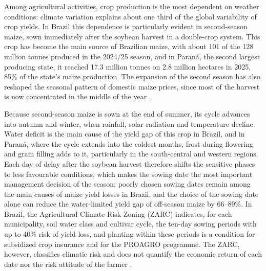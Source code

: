 \documentclass[10pt,a4paper]{article}
\begin{document}
Among agricultural activities, crop production is the most dependent on weather conditions: climate
variation explains about one third of the global variability of crop yields. In Brazil this dependence
is particularly evident in second-season maize, sown immediately after the soybean harvest in a
double-crop system. This crop has become the main source of Brazilian maize,
with about 101 of the 128 million tonnes produced in the 2024/25 season, and in Paraná, the second
largest producing state, it reached 17.3 million tonnes on 2.8 million hectares in 2025, 85\% of the
state's maize production. The expansion of the second season has also reshaped the seasonal pattern
of domestic maize prices, since most of the harvest is now concentrated in the middle of the year
\citep{ray2015, conab2025, ibge2025, souza2021}.

Because second-season maize is sown at the end of summer, its cycle advances into autumn and winter,
when rainfall, solar radiation and temperature decline. Water deficit is the main cause of the yield
gap of this crop in Brazil, and in Paraná, where the cycle extends into the coldest months, frost
during flowering and grain filling adds to it, particularly in the south-central and western regions.
Each day of delay after the soybean harvest therefore shifts the sensitive phases to less favourable
conditions, which makes the sowing date the most important management decision of the season; poorly
chosen sowing dates remain among the main causes of maize yield losses in Brazil, and the choice of the
sowing date alone can reduce the water-limited yield gap of off-season maize by 66--89\%. In Brazil, the Agricultural Climate Risk
Zoning (ZARC) indicates, for each municipality, soil water class and cultivar cycle, the ten-day sowing
periods with up to 40\% risk of yield loss, and planting within these periods is a condition for
subsidized crop insurance and for the PROAGRO programme. The ZARC, however, classifies climatic risk
and does not quantify the economic return of each date nor the risk attitude of the farmer
\citep{goncalves2002, andrea2018, noia2019eja, noia2019agsy, noia2020, monteiro2021, embrapa2023}.
\end{document}

